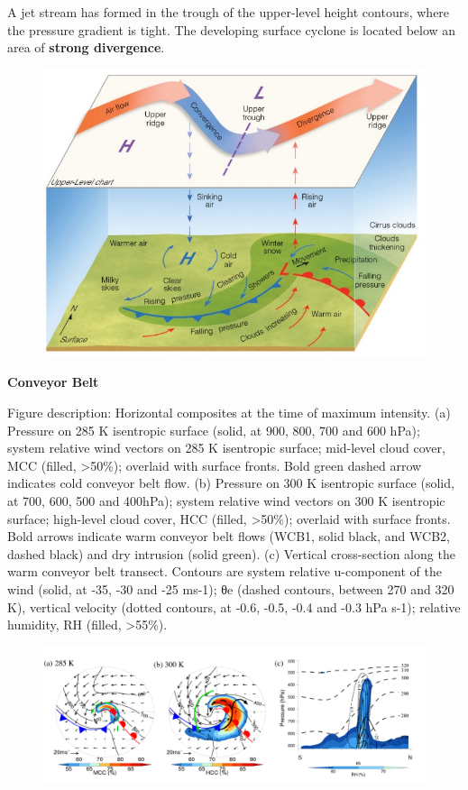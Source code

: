 \documentclass[12pt,oneside]{book}
\begin{document}
A jet stream has formed in the trough of the upper-level height
contours, where the pressure gradient is tight. The developing surface
cyclone is located below an area of \textbf{strong divergence}.

\begin{figure}

{\centering \includegraphics[width=0.8\linewidth]{figures/Figure633c} 

}

\caption{ }\label{fig:Fig633c}
\end{figure}

\textbf{Conveyor Belt}

Figure description: Horizontal composites at the time of maximum
intensity. (a) Pressure on 285 K isentropic surface (solid, at 900, 800,
700 and 600 hPa); system relative wind vectors on 285 K isentropic
surface; mid-level cloud cover, MCC (filled, \textgreater{}50\%);
overlaid with surface fronts. Bold green dashed arrow indicates cold
conveyor belt flow. (b) Pressure on 300 K isentropic surface (solid, at
700, 600, 500 and 400hPa); system relative wind vectors on 300 K
isentropic surface; high-level cloud cover, HCC (filled,
\textgreater{}50\%); overlaid with surface fronts. Bold arrows indicate
warm conveyor belt flows (WCB1, solid black, and WCB2, dashed black) and
dry intrusion (solid green). (c) Vertical cross-section along the warm
conveyor belt transect. Contours are system relative u-component of the
wind (solid, at -35, -30 and -25 ms-1); θe (dashed contours, between 270
and 320 K), vertical velocity (dotted contours, at -0.6, -0.5, -0.4 and
-0.3 hPa s-1); relative humidity, RH (filled, \textgreater{}55\%).

\begin{figure}

{\centering \includegraphics[width=1\linewidth]{figures/Figure633d} 

}

\caption{ }\label{fig:Fig633d}
\end{figure}
\end{document}
